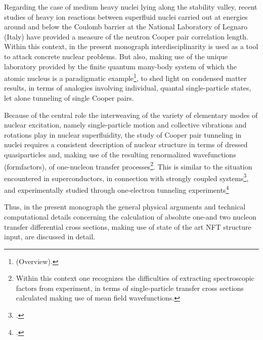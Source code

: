 Regarding the case of medium heavy nuclei lying along the stability valley, recent studies of heavy ion reactions between superfluid nuclei carried out at energies around and  below the Coulomb barrier at the National Laboratory of Legnaro (Italy) have provided a measure of the neutron Cooper pair correlation length. Within this context, in the present monograph interdisciplinarity is used as a tool to attack concrete nuclear problems. But also, making use of the unique laboratory provided by the finite quantum many-body system of which the atomic nucleus is a paradigmatic example\footnote{\cite{Bohr:19} (Overview).}, to shed light on condensed matter results, in terms of analogies involving individual, quantal single-particle states, let alone tunneling of single Cooper pairs.


Because of the central role the interweaving of the variety of elementary modes of nuclear excitation, namely single-particle motion and collective vibrations and rotations play in nuclear superfluidity, the study of Cooper pair tunneling in nuclei requires  a consistent description of nuclear structure in terms of dressed quasiparticles and, making use of the resulting renormalized wavefunctions (formfactors),  of one-nucleon transfer processes\footnote{Within this context one recognizes the difficulties of extracting spectroscopic factors from experiment, in terms of single-particle transfer cross sections calculated making use of mean field wavefunctions.}. This is similar to the situation encountered in superconductors, in connection with strongly coupled systems\footnote{\cite{Eliashberg:60}.}, and experimentally studied through one-electron tunneling experiments\footnote{\cite{Giaver:73}.} 

Thus, in the present monograph the general physical arguments and technical computational details concerning the   calculation of  absolute one-and two nucleon  transfer differential cross sections, making use of state of the art NFT structure input, are discussed in detail. 


